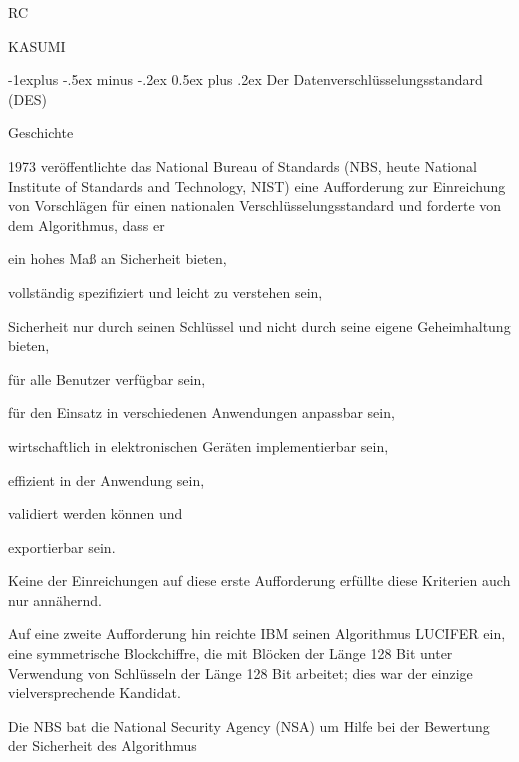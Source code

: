 \documentclass[a4paper]{article}
\makeatletter
\renewcommand{\subsection}{\@startsection{subsection}{2}{0mm}%
 {-1explus -.5ex minus -.2ex}%
 {0.5ex plus .2ex}%
 {\normalfont\normalsize\bfseries}}
\makeatother
\begin{document}
\begin{multicols}{3}
\begin{itemize*}
            \begin{itemize*}
                  \item RC
                  \item KASUMI
            \end{itemize*}
      \end{itemize*}


      \subsection{Der Datenverschlüsselungsstandard
            (DES)}

      Geschichte

      \begin{itemize*}
            \item
            1973 veröffentlichte das National Bureau of Standards (NBS, heute
            National Institute of Standards and Technology, NIST) eine
            Aufforderung zur Einreichung von Vorschlägen für einen nationalen
            Verschlüsselungsstandard und forderte von dem Algorithmus, dass er

            \begin{itemize*}
                  \item ein hohes Maß an Sicherheit bieten,
                  \item vollständig spezifiziert und leicht zu verstehen sein,
                  \item Sicherheit nur durch seinen Schlüssel und nicht durch seine eigene Geheimhaltung bieten,
                  \item für alle Benutzer verfügbar sein,
                  \item für den Einsatz in verschiedenen Anwendungen anpassbar sein,
                  \item wirtschaftlich in elektronischen Geräten implementierbar sein,
                  \item effizient in der Anwendung sein,
                  \item validiert werden können und
                  \item exportierbar sein.
            \end{itemize*}
            \item
            Keine der Einreichungen auf diese erste Aufforderung erfüllte diese
            Kriterien auch nur annähernd.
            \item
            Auf eine zweite Aufforderung hin reichte IBM seinen Algorithmus
            LUCIFER ein, eine symmetrische Blockchiffre, die mit Blöcken der Länge
            128 Bit unter Verwendung von Schlüsseln der Länge 128 Bit arbeitet;
            dies war der einzige vielversprechende Kandidat.
            \item
            Die NBS bat die National Security Agency (NSA) um Hilfe bei der
            Bewertung der Sicherheit des Algorithmus


\end{itemize*}
\end{multicols}
\end{document}

